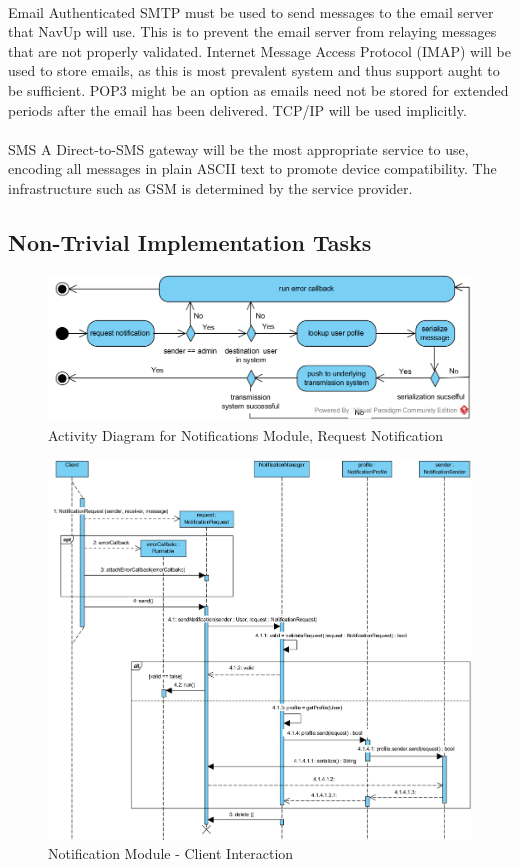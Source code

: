 \documentclass{article}
\begin{document}
\paragraph{}Email Authenticated SMTP must be used to send messages to the email server that
NavUp will use. This is to prevent the email server from relaying messages that are
not properly validated. Internet Message Access Protocol (IMAP) will be used to store
emails, as this is most prevalent system and thus support aught to be sufficient. POP3
might be an option as emails need not be stored for extended periods after the email
has been delivered. TCP/IP will be used implicitly.
\paragraph{}SMS A Direct-to-SMS gateway will be the most appropriate service to use, encoding
all messages in plain ASCII text to promote device compatibility. The infrastructure
such as GSM is determined by the service provider.

\subsection{Non-Trivial Implementation Tasks}
\begin{figure}[H]
\includegraphics[width=\textwidth]{notification-activity-send}
\caption{Activity Diagram for Notifications Module, Request Notification}
\end{figure}
\begin{figure}[H]
\includegraphics[width=\textwidth]{notification-module-client-interaction}
\caption{Notification Module - Client Interaction}
\end{figure}
\end{document}
